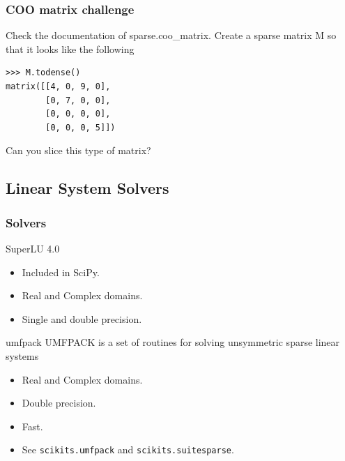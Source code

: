 \documentclass[10pt,colorlinks]{beamer}
\begin{document}
\begin{frame}[fragile]\frametitle{COO matrix challenge}
\begin{block}{Check the documentation of sparse.coo\_matrix. Create a sparse matrix M so that it looks like the following}

\begin{verbatim}
>>> M.todense()
matrix([[4, 0, 9, 0],
        [0, 7, 0, 0],
        [0, 0, 0, 0],
        [0, 0, 0, 5]])
\end{verbatim}

Can you slice this type of matrix? 
\end{block}

\end{frame}


\subsection{Linear System Solvers} %
\label{sub:Linear_System_Solvers}
\begin{frame}[fragile]\frametitle{Solvers}
\begin{block}{SuperLU 4.0}
\begin{itemize}
    \item Included in SciPy.
    \item Real and Complex domains.
    \item Single and double precision.
\end{itemize}
\end{block}
\begin{block}{umfpack}
UMFPACK is a set of routines for solving unsymmetric sparse linear systems
\begin{itemize}
    \item Real and Complex domains.
    \item Double precision.
    \item Fast.
    \item See \verb|scikits.umfpack| and \verb|scikits.suitesparse|. 
\end{itemize}
\end{block}
\end{frame}
\end{document}
